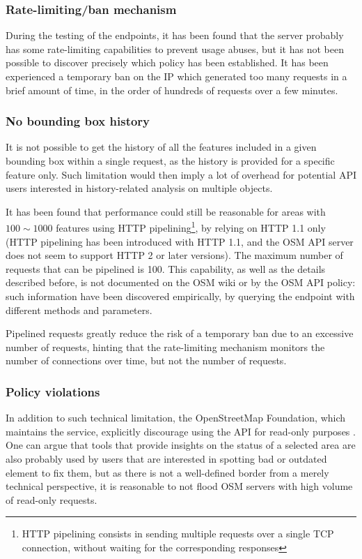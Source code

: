 \documentclass{Configuration_Files/PoliMi3i_thesis}
\begin{document}
\subsubsection{Rate-limiting/ban mechanism}

During the testing of the endpoints, it has been found that the server probably has some rate-limiting capabilities to prevent usage abuses, but it has not been possible to discover precisely which policy has been established. It has been experienced a temporary ban on the IP which generated too many requests in a brief amount of time, in the order of hundreds of requests over a few minutes.

\subsubsection{No bounding box history}

It is not possible to get the history of all the features included in a given bounding box within a single request, as the history is provided for a specific feature only. Such limitation would then imply a lot of overhead for potential API users interested in history-related analysis on multiple objects.

It has been found that performance could still be reasonable for areas with $ 100 \sim 1000 $ features using HTTP pipelining\footnote{HTTP pipelining consists in sending multiple requests over a single TCP connection, without waiting for the corresponding responses}, by relying on HTTP 1.1 only (HTTP pipelining has been introduced with HTTP 1.1, and the OSM API server does not seem to support HTTP 2 or later versions). The maximum number of requests that can be pipelined is 100. This capability, as well as the details described before, is not documented on the OSM wiki or by the OSM API policy: such information have been discovered empirically, by querying the endpoint with different methods and parameters.

Pipelined requests greatly reduce the risk of a temporary ban due to an excessive number of requests, hinting that the rate-limiting mechanism monitors the number of connections over time, but not the number of requests.

\subsubsection{Policy violations}

In addition to such technical limitation, the OpenStreetMap Foundation, which maintains the service, explicitly discourage using the API for read-only purposes \cite{APIUsagePolicy}. One can argue that tools that provide insights on the status of a selected area are also probably used by users that are interested in spotting bad or outdated element to fix them, but as there is not a well-defined border from a merely technical perspective, it is reasonable to not flood OSM servers with high volume of read-only requests.
\end{document}
